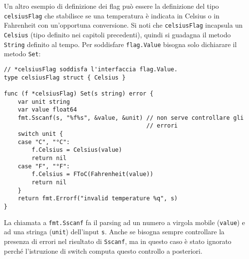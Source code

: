 \documentclass[../../thesis.tex]{subfiles}
\begin{document}
    Un altro esempio di definizione dei flag può essere la definizione del tipo \verb"celsiusFlag" che stabilisce se una temperatura è indicata in Celsius o in Fahrenheit con un'opportuna conversione.
    Si noti che \verb"celsiusFlag" incapsula un \verb"Celsius" (tipo definito nei capitoli precedenti), quindi si guadagna il metodo \verb"String" definito al tempo.
    Per soddisfare \verb"flag.Value" bisogna solo dichiarare il metodo \verb"Set":
    \begin{lstlisting}[frame = single, label = {lst:lstlisting6-4.5}]
// *celsiusFlag soddisfa l'interfaccia flag.Value.
type celsiusFlag struct { Celsius }

func (f *celsiusFlag) Set(s string) error {
    var unit string
    var value float64
    fmt.Sscanf(s, "%f%s", &value, &unit) // non serve controllare gli
                                         // errori
    switch unit {
    case "C", "°C":
        f.Celsius = Celsius(value)
        return nil
    case "F", "°F":
        f.Celsius = FToC(Fahrenheit(value))
        return nil
    }
    return fmt.Errorf("invalid temperature %q", s)
}
    \end{lstlisting}
    La chiamata a \verb"fmt.Sscanf" fa il parsing ad un numero a virgola mobile (\verb"value") e ad una stringa (\verb"unit") dell'input \verb"s".
    Anche se bisogna sempre controllare la presenza di errori nel risultato di \verb"Sscanf", ma in questo caso è stato ignorato perché l'istruzione di switch computa questo controllo a posteriori.
    \hfill \vspace{12pt}
\end{document}
